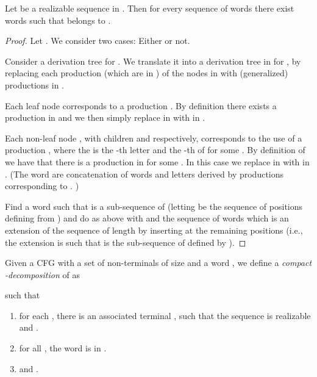 \documentclass{CSML}
\begin{document}
 
\begin{lem}\label{lem:de_word}
Let  be a realizable sequence in .
Then for every sequence of words 
there exist words  such that
 belongs to .
\label{l:meaning-of-realizability}
\end{lem} 
\begin{proof}
\newcommand{\reSeq}{\alpha}
Let .
We consider two cases: Either  or not.

 \smallskip{}
Consider a derivation tree  for . We translate it into a derivation tree in  for 
, by replacing each production (which are in ) of the nodes in  with (generalized) productions in .
 
Each leaf node  corresponds to a production . By definition there exists a production  in  and we then simply replace  in  with  in .

Each non-leaf node , with children  and  respectively, corresponds to the use of a production , where the  is the -th letter and  the -th of  for some .
By definition of  we have that there is a production  in  for some . In this case we replace  in  with  in .
(The word  are concatenation of words  and letters derived  by productions  corresponding to . )

 \smallskip{}
Find a word  such that  is a sub-sequence of  (letting  be the sequence of positions defining  from ) and do as above with  and the sequence of words  which is an extension of the sequence  of length  by inserting  at the remaining positions (i.e., the extension is such that  is the sub-sequence of  defined by ).
\end{proof}


\smallskip{}
Given a CFG  with a set of non-terminals of size  and a word , we define 
a \emph{compact -decomposition} of  as  

 such that
\begin{enumerate}
\item for each , there is an associated terminal , such that the sequence  is realizable and .
\item for all , the word  is in . 
\item  and .
\end{enumerate}
\end{document}
